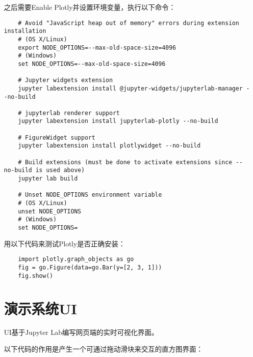 之后需要Enable Plotly并设置环境变量，执行以下命令：

\begin{verbatim}
    # Avoid "JavaScript heap out of memory" errors during extension installation
    # (OS X/Linux)
    export NODE_OPTIONS=--max-old-space-size=4096
    # (Windows)
    set NODE_OPTIONS=--max-old-space-size=4096

    # Jupyter widgets extension
    jupyter labextension install @jupyter-widgets/jupyterlab-manager --no-build

    # jupyterlab renderer support
    jupyter labextension install jupyterlab-plotly --no-build

    # FigureWidget support
    jupyter labextension install plotlywidget --no-build

    # Build extensions (must be done to activate extensions since --no-build is used above)
    jupyter lab build

    # Unset NODE_OPTIONS environment variable
    # (OS X/Linux)
    unset NODE_OPTIONS
    # (Windows)
    set NODE_OPTIONS=
\end{verbatim}

用以下代码来测试Plotly是否正确安装：

\begin{verbatim}
    import plotly.graph_objects as go
    fig = go.Figure(data=go.Bar(y=[2, 3, 1]))
    fig.show()
\end{verbatim}

\section{演示系统UI}

UI基于Jupyter Lab编写网页端的实时可视化界面。

以下代码的作用是产生一个可通过拖动滑块来交互的直方图界面：


